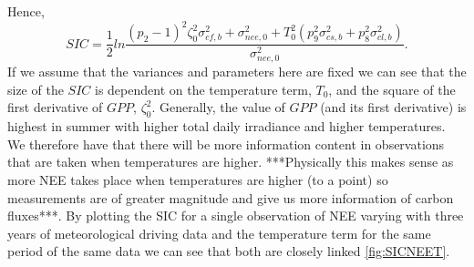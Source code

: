 \documentclass[11pt]{article}
\begin{document}
Hence,
\[
SIC = \frac{1}{2}ln\frac{(p_{2}-1)^{2}\zeta_0^{2}\sigma_{cf,b}^{2}+\sigma_{nee,0}^{2}+T_{0}^2(p_{9}^2\sigma_{cs,b}^2+p_8^2\sigma_{cl,b}^2)}{\sigma_{nee,0}^{2}}.
\]
If we assume that the variances and parameters here are fixed we can see that the size of the $SIC$ is dependent on the temperature term, $T_0$, and the square of the first derivative of $GPP$, $\zeta_0^{2}$. Generally, the value of $GPP$ (and its first derivative) is highest in summer with higher total daily irradiance and higher temperatures. We therefore have that there will be more information content in observations that are taken when temperatures are higher. ***Physically this makes sense as more NEE takes place when temperatures are higher (to a point) so measurements are of greater magnitude and give us more information of carbon fluxes***. By plotting the SIC for a single observation of NEE varying with three years of meteorological driving data and the temperature term for the same period of the same data we can see that both are closely linked \ref{fig:SICNEET}.
\end{document}
